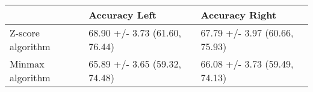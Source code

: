 \begin{tabular}{lll}
\toprule
{} &                  Accuracy Left &                 Accuracy Right \\
\midrule
Z-score algorithm &  68.90 +/- 3.73 (61.60, 76.44) &  67.79 +/- 3.97 (60.66, 75.93) \\
Minmax algorithm  &  65.89 +/- 3.65 (59.32, 74.48) &  66.08 +/- 3.73 (59.49, 74.13) \\
\bottomrule
\end{tabular}
